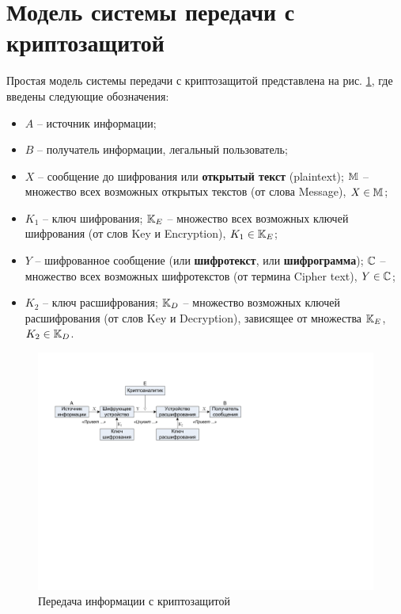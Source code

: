 \section{Модель системы передачи с криптозащитой}

Простая модель системы передачи с криптозащитой представлена на рис. \ref{pic:Encrypt}, где введены следующие обозначения:
\begin{itemize}
    \item $A$ -- источник информации;
    \item $B$ -- получатель информации, легальный пользователь;
    \item $X$ -- сообщение до шифрования или \textbf{открытый текст} (plaintext); $\mathbb{M}$ -- множество всех возможных открытых текстов (от слова Message), $X \in \mathbb{M}$;
    \item $K_1$ -- ключ шифрования; $\mathbb{K}_E$ -- множество всех возможных ключей шифрования  (от слов Key и Encryption), $K_1 \in \mathbb{K}_E$;
    \item $Y$ -- шифрованное сообщение (или \textbf{шифротекст}, или \textbf{шифрограмма}); $\mathbb{C}$ -- множество всех возможных шифротекстов (от термина Cipher text), $Y \in \mathbb{C}$;
    \item $K_2$ -- ключ расшифрования; $\mathbb{K}_D$  -- множество возможных ключей расшифрования  (от слов Key и Decryption), зависящее от множества $\mathbb{K}_E$, $K_2 \in \mathbb{K}_D$.
\end{itemize}

\begin{figure}[!ht]
	\centering
	\includegraphics[width=1.0\textwidth]{pic/scheme-of-cipher}
	\caption{Передача информации с криптозащитой\label{pic:Encrypt}}
\end{figure}

